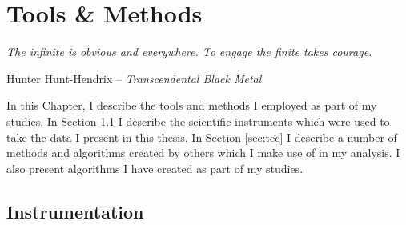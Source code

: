 \chapter{Tools \& Methods}
\label{ch:methods}

\epigraph{\textit{The infinite is obvious and everywhere. To engage the finite takes courage.}}{Hunter Hunt-Hendrix -- \textit{Transcendental Black Metal}}

\vspace{1cm}

\par\noindent In this Chapter, I describe the tools and methods I employed as part of my studies.  In Section \ref{sec:sat} I describe the scientific instruments which were used to take the data I present in this thesis.  In Section \ref{sec:tec} I describe a number of methods and algorithms created by others which I make use of in my analysis.  I also present algorithms I have created as part of my studies.

\section{Instrumentation}

\label{sec:sat}

